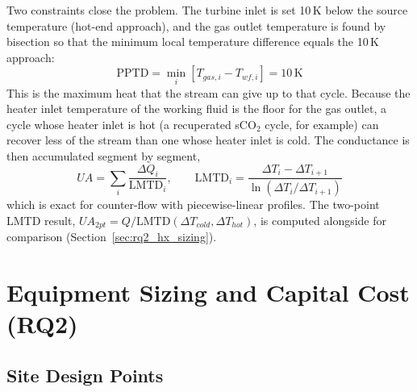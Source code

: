\documentclass[12pt,a4paper]{report}
\begin{document}
Two constraints close the problem. The turbine inlet is set 10\,K below the
source temperature (hot-end approach), and the gas outlet temperature is
found by bisection so that the minimum local temperature difference equals
the 10\,K approach:
\begin{equation}
\mathrm{PPTD} = \min_{i}\!\left[T_{gas,i} - T_{wf,i}\right] = 10\,\text{K}
\label{eq:pptd}
\end{equation}
This is the maximum heat that the stream can give up to that cycle. Because
the heater inlet temperature of the working fluid is the floor for the gas
outlet, a cycle whose heater inlet is hot (a recuperated sCO$_2$ cycle, for
example) can recover less of the stream than one whose heater inlet is cold.
The conductance is then accumulated segment by segment,
\begin{equation}
UA = \sum_{i} \frac{\Delta Q_i}{\mathrm{LMTD}_i}, \qquad
\mathrm{LMTD}_i = \frac{\Delta T_{i} - \Delta T_{i+1}}{\ln(\Delta T_{i}/\Delta T_{i+1})}
\label{eq:seg_UA}
\end{equation}
which is exact for counter-flow with piecewise-linear profiles. The two-point
LMTD result, $UA_{2pt} = Q/\mathrm{LMTD}(\Delta T_{cold},\Delta T_{hot})$, is
computed alongside for comparison (Section~\ref{sec:rq2_hx_sizing}).

\section{Equipment Sizing and Capital Cost (RQ2)}
\label{sec:method_rq2}

\subsection{Site Design Points}
\label{sec:method_sitedesign}
\end{document}
